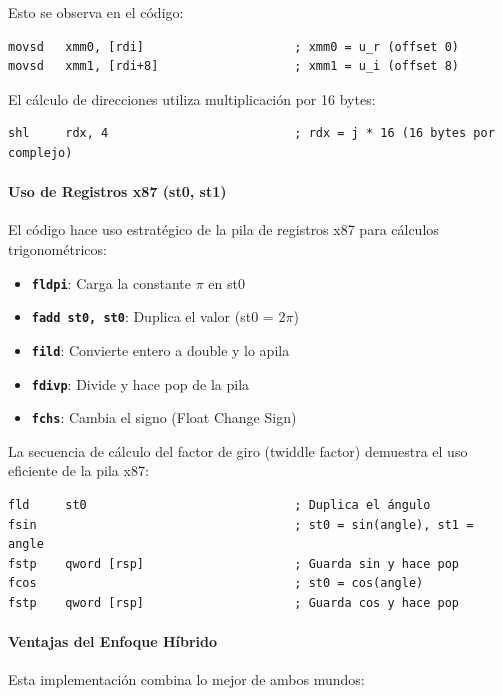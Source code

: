 \documentclass[a4paper]{article}
\begin{document}
Esto se observa en el código:
\begin{verbatim}
movsd   xmm0, [rdi]                     ; xmm0 = u_r (offset 0)
movsd   xmm1, [rdi+8]                   ; xmm1 = u_i (offset 8)
\end{verbatim}

El cálculo de direcciones utiliza multiplicación por 16 bytes:
\begin{verbatim}
shl     rdx, 4                          ; rdx = j * 16 (16 bytes por complejo)
\end{verbatim}

\paragraph{Uso de Registros x87 (st0, st1)}

El código hace uso estratégico de la pila de registros x87 para cálculos trigonométricos:

\begin{itemize}
    \item \textbf{\texttt{fldpi}}: Carga la constante $\pi$ en st0
    \item \textbf{\texttt{fadd st0, st0}}: Duplica el valor (st0 = 2$\pi$)
    \item \textbf{\texttt{fild}}: Convierte entero a double y lo apila
    \item \textbf{\texttt{fdivp}}: Divide y hace pop de la pila
    \item \textbf{\texttt{fchs}}: Cambia el signo (Float Change Sign)
\end{itemize}

La secuencia de cálculo del factor de giro (twiddle factor) demuestra el uso eficiente de la pila x87:

\begin{verbatim}
fld     st0                             ; Duplica el ángulo
fsin                                    ; st0 = sin(angle), st1 = angle
fstp    qword [rsp]                     ; Guarda sin y hace pop
fcos                                    ; st0 = cos(angle)
fstp    qword [rsp]                     ; Guarda cos y hace pop
\end{verbatim}

\paragraph{Ventajas del Enfoque Híbrido}

Esta implementación combina lo mejor de ambos mundos:
\end{document}

